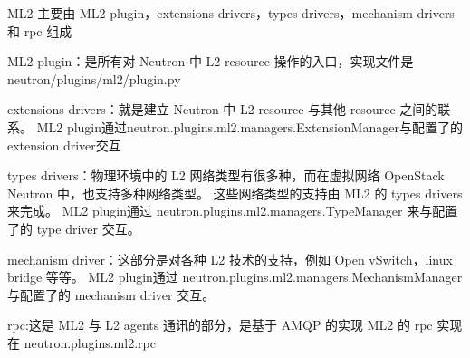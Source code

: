 
ML2 主要由 ML2 plugin，extensions drivers，types drivers，mechanism drivers 和 rpc 组成

ML2 plugin：是所有对 Neutron 中 L2 resource 操作的入口，实现文件是 neutron/plugins/ml2/plugin.py


extensions drivers：就是建立 Neutron 中 L2 resource 与其他 resource 之间的联系。
ML2 plugin通过neutron.plugins.ml2.managers.ExtensionManager与配置了的extension driver交互

types drivers：物理环境中的 L2 网络类型有很多种，而在虚拟网络 OpenStack Neutron 中，也支持多种网络类型。
这些网络类型的支持由 ML2 的 types drivers 来完成。
ML2 plugin通过 neutron.plugins.ml2.managers.TypeManager 来与配置了的 type driver 交互。

mechanism driver：这部分是对各种 L2 技术的支持，例如 Open vSwitch，linux bridge 等等。
ML2 plugin通过 neutron.plugins.ml2.managers.MechanismManager 与配置了的 mechanism driver 交互。

rpc:这是 ML2 与 L2 agents 通讯的部分，是基于 AMQP 的实现
ML2 的 rpc 实现在 neutron.plugins.ml2.rpc
